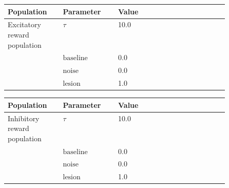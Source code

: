 \documentclass{article}
\begin{document}
\noindent
\begin{tabularx}{\linewidth}{|p{0.25\linewidth}|p{0.25\linewidth}|X|}\hline
\textbf{Population} & \textbf{Parameter} & \textbf{Value}   \\ \hline

    Excitatory reward population             & $\tau$        & 10.0  \\ \hline

                 & ${\text{baseline}}$        & 0.0  \\ \hline

                 & ${\text{noise}}$        & 0.0  \\ \hline

                 & ${\text{lesion}}$        & 1.0  \\ \hline

\end{tabularx}

\vspace{2ex}

\noindent
\begin{tabularx}{\linewidth}{|p{0.25\linewidth}|p{0.25\linewidth}|X|}\hline
\textbf{Population} & \textbf{Parameter} & \textbf{Value}   \\ \hline

    Inhibitory reward population             & $\tau$        & 10.0  \\ \hline

                 & ${\text{baseline}}$        & 0.0  \\ \hline

                 & ${\text{noise}}$        & 0.0  \\ \hline

                 & ${\text{lesion}}$        & 1.0  \\ \hline

\end{tabularx}

\vspace{2ex}
\end{document}
